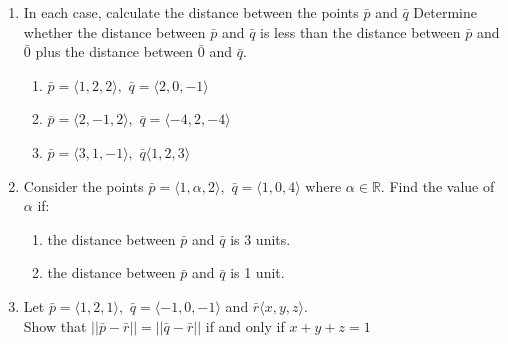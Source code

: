 
\begin{exercisebox}
\begin{enumerate}[label=\arabic*., series=exercises]

\item In each case, calculate the distance between the points $\bar{p}$ and $\bar{q}$
      Determine whether the distance between $\bar{p}$ and $\bar{q}$ is less than the 
      distance between $\bar{p}$ and $\bar{0}$ plus the distance between $\bar{0}$ and $\bar{q}$.

      \begin{enumerate}[label=(\alph*)]
        \item $\bar{p} = \langle 1, 2, 2 \rangle,$ \quad $\bar{q} = \langle 2, 0, -1 \rangle$
        \item $\bar{p} = \langle 2, -1, 2 \rangle,$ \quad $\bar{q} = \langle -4, 2, -4 \rangle$
        \item $\bar{p} = \langle 3, 1, -1 \rangle,$ \quad $\bar{q}\langle 1, 2, 3 \rangle$
      \end{enumerate}

\item Consider the points $\bar{p} = \langle 1, \alpha, 2 \rangle,$ \quad $\bar{q} = \langle 1, 0, 4\rangle$ where $\alpha \in \mathbb{R}$.
      Find the value of $\alpha$ if:
      \begin{enumerate}[label=(\alph*)]
        \item the distance between $\bar{p}$ and $\bar{q}$ is 3 units.
        \item the distance between $\bar{p}$ and $\bar{q}$ is 1 unit.
      \end{enumerate}

\item Let $\bar{p} = \langle 1, 2, 1 \rangle,$ \quad $\bar{q} = \langle -1, 0, -1 \rangle$ and $\bar{r}\langle x, y, z \rangle$.\\
      Show that $||\bar{p} - \bar{r}|| = ||\bar{q} - \bar{r}||$ if and only if $x+y+z=1$

\end{enumerate}
\end{exercisebox}